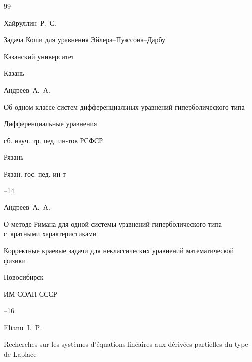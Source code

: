 \RusRef







\begin{thebibliography}{99}






\by  Хайруллин~Р.~С.

\book Задача Коши для уравнения Эйлера--Пуассона--Дарбу

\publ Казанский университет

\publaddr Казань










\by Андреев~А.~А.

\paper Об одном классе систем дифференциальных уравнений гиперболического типа 

\inbook Дифференциальные уравнения

\bookinfo сб. науч. тр. пед. ин-тов РСФСР

\publaddr Рязань

\publ Рязан. гос. пед. ин-т



--14







\by Андреев~А.~А.

\paper О методе Римана для одной системы уравнений гиперболического типа с~кратными характеристиками

\inbook Корректные краевые задачи для неклассических уравнений математической физики

\publaddr Новосибирск

\publ ИМ СОАН СССР


--16






\by  Elianu~I.~P.

\paper Recherches sur les syst\`emes d'\'equations lin\'eaires aux d\'eriv\'ees partielles du type de Laplace


\end{thebibliography}
